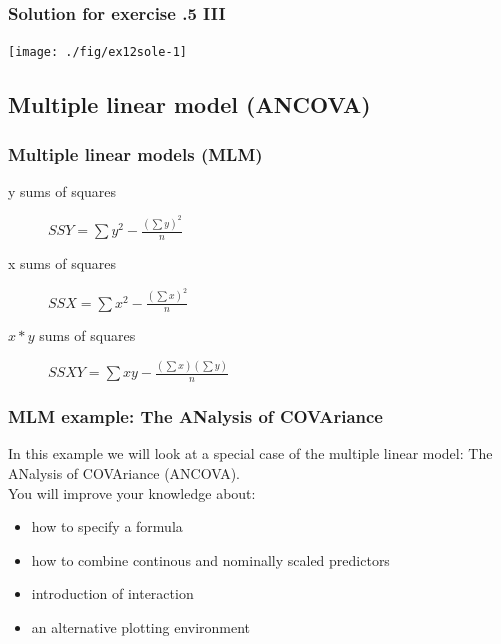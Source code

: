 \documentclass[xcolor=table, xcolor=dvipsnames]{beamer}\usepackage[]{graphicx}\usepackage[]{color}
\newenvironment{knitrout}{}{} %
\newcounter{exercisecount}
\begin{document}

\begin{frame}[fragile]\frametitle{Solution for exercise .5 III}
\begin{knitrout}
\color{fgcolor}

{\centering \texttt{[image: ./fig/ex12sole-1]} 

}



\end{knitrout}
\end{frame}

\subsection{Multiple linear model (ANCOVA)}

\begin{frame}[fragile]\frametitle{Multiple linear models (MLM)}
\begin{description}
\item [y sums of squares] \( SSY=\sum y^2 - \frac{(\sum y)^2}{n}\)
\item [x sums of squares] \( SSX=\sum x^2 - \frac{(\sum x)^2}{n}\)
\item [$x*y$ sums of squares] \( SSXY=\sum xy - \frac{(\sum x)(\sum y)}{n}\)
\end{description}
\end{frame}




\begin{frame}[fragile]\frametitle{MLM example: The ANalysis of COVAriance}
In this example we will look at a special case of the multiple linear model: The ANalysis of COVAriance (ANCOVA).\\[\baselineskip]
You will improve your knowledge about:
\begin{itemize}
\item how to specify a formula
\item how to combine continous and nominally scaled predictors
\item introduction of interaction
\item an alternative plotting environment
\end{itemize}
\end{frame}
\end{document}

